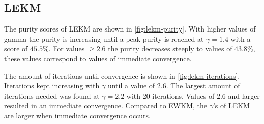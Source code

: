 \documentclass[../report.tex]{subfiles}
\begin{document}



\subsection{LEKM}
The purity scores of LEKM are shown in \cref{fig:lekm-purity}. With higher values of gamma the purity is increasing until a peak purity is reached at $\gamma = 1.4$ with a score of $45.5\%$. For values $\geq 2.6$ the purity decreases steeply to values of $43.8\%$, these values correspond to values of immediate convergence.

The amount of iterations until convergence is shown in \cref{fig:lekm-iterations}. Iterations kept increasing with $\gamma$ until a value of $2.6$. The largest amount of iterations needed was found at $\gamma=2.2$ with 20 iterations. Values of $2.6$ and larger resulted in an immediate convergence. Compared to EWKM, the $\gamma$'s of LEKM are larger when immediate convergence occurs.


\end{document}
